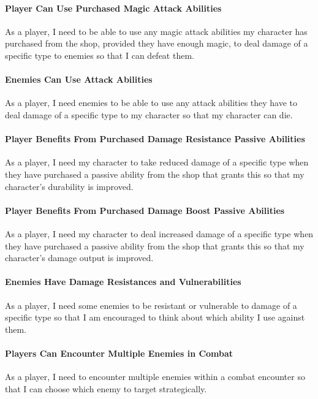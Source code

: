 \paragraph{Player Can Use Purchased Magic Attack Abilities}
As a player, I need to be able to use any magic attack abilities my character has purchased from the shop, provided they have enough magic, to deal damage of a specific type to enemies so that I can defeat them.

\paragraph{Enemies Can Use Attack Abilities}
As a player, I need enemies to be able to use any attack abilities they have to deal damage of a specific type to my character so that my character can die.

\paragraph{Player Benefits From Purchased Damage Resistance Passive Abilities}
As a player, I need my character to take reduced damage of a specific type when they have purchased a passive ability from the shop that grants this so that my character's durability is improved.

\paragraph{Player Benefits From Purchased Damage Boost Passive Abilities}
As a player, I need my character to deal increased damage of a specific type when they have purchased a passive ability from the shop that grants this so that my character's damage output is improved.

\paragraph{Enemies Have Damage Resistances and Vulnerabilities}
As a player, I need some enemies to be resistant or vulnerable to damage of a specific type so that I am encouraged to think about which ability I use against them.

\paragraph{Players Can Encounter Multiple Enemies in Combat}
As a player, I need to encounter multiple enemies within a combat encounter so that I can choose which enemy to target strategically.

